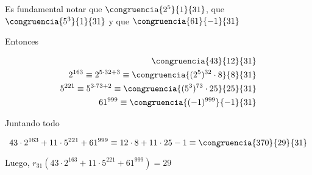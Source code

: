 \begin{enumerate}[label=(\alph*)]
Es fundamental notar que $\congruencia{2^5}{1}{31}$, que $\congruencia{5^3}{1}{31}$ y que $\congruencia{61}{-1}{31}$ \par

Entonces

\begin{align*}
  \congruencia{43}{12}{31} \\
  2^{163} \equiv 2^{5 \cdot 32 + 3} \equiv \congruencia{(2^5)^{32} \cdot 8}{8}{31} \\
  5^{221} \equiv 5^{3 \cdot 73+2} \equiv \congruencia{(5^3)^{73} \cdot 25}{25}{31} \\
  61^{999} \equiv \congruencia{(-1)^{999}}{-1}{31}
\end{align*}

Juntando todo

$$
43 \cdot 2^{163} + 11 \cdot 5^{221} + 61^{999} 
\equiv
12 \cdot 8 + 11 \cdot 25 -1
\equiv
\congruencia{370}{29}{31}
$$

Luego, $\boxed{r_{31}(43 \cdot 2^{163} + 11 \cdot 5^{221} + 61^{999})=29}$
\end{enumerate}



\begin{aportes}
    \item {}
\end{aportes}
